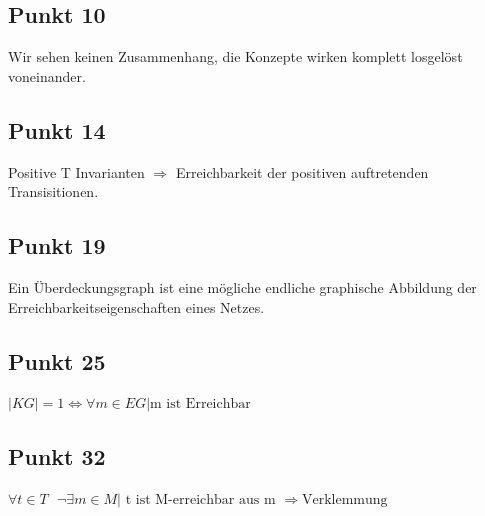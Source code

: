 \documentclass[10pt]{scrartcl}
\begin{document}
				\subsection{Punkt 10}
				Wir sehen keinen Zusammenhang, die Konzepte wirken komplett losgelöst voneinander.
				
				\subsection{Punkt 14}	
				Positive T Invarianten $\Longrightarrow$ Erreichbarkeit der positiven auftretenden Transisitionen. 
				
				\subsection{Punkt 19}
				Ein Überdeckungsgraph ist eine mögliche endliche graphische Abbildung der Erreichbarkeitseigenschaften eines Netzes.
				
				\subsection{Punkt 25}
				$|KG| = 1 \Longleftrightarrow \forall m \in EG | \text{m ist Erreichbar}$ 
			
				\subsection{Punkt 32}
				$\forall t  \in T \textbf{ } \neg \exists m \in M | \text{ t ist M-erreichbar aus m } \Longrightarrow \text{Verklemmung} $
\end{document}

